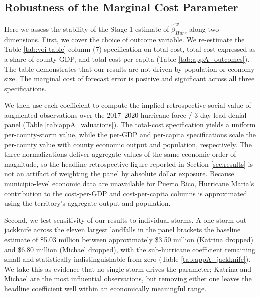 \documentclass[12pt]{article}%
\begin{document}
\begin{appendices}

\section{Robustness of the Marginal Cost Parameter} \label{app:beta}

Here we assess the stability of the Stage 1 estimate of $\hat{\beta}^w_{Hurr}$ along two dimensions. First, we cover the choice of outcome variable. We re-estimate the Table \ref{tab:voi-table} column (7) specification on total cost, total cost expressed as a share of county GDP, and total cost per capita (Table \ref{tab:appA_outcomes}). The table demonstrates that our results are not driven by population or economy size. The marginal cost of forecast error is positive and significant across all three specifications.

We then use each coefficient to compute the implied retrospective social value of augmented observations over the 2017--2020 hurricane-force / 3-day-lead denial panel (Table \ref{tab:appA_valuations}). The total-cost specification yields a uniform per-county-storm value, while the per-GDP and per-capita specifications scale the per-county value with county economic output and population, respectively. The three normalizations deliver aggregate values of the same economic order of magnitude, so the headline retrospective figure reported in Section \ref{sec:results} is not an artifact of weighting the panel by absolute dollar exposure. Because municipio-level economic data are unavailable for Puerto Rico, Hurricane Maria's contribution to the cost-per-GDP and cost-per-capita columns is approximated using the territory's aggregate output and population.

Second, we test sensitivity of our results to individual storms. A one-storm-out jackknife across the eleven largest landfalls in the panel brackets the baseline estimate of \$5.03 million between approximately \$3.50 million (Katrina dropped) and \$6.80 million (Michael dropped), with the sub-hurricane coefficient remaining small and statistically indistinguishable from zero (Table \ref{tab:appA_jackknife}). We take this as evidence that no single storm drives the parameter; Katrina and Michael are the most influential observations, but removing either one leaves the headline coefficient well within an economically meaningful range.


\end{appendices}
\end{document}
